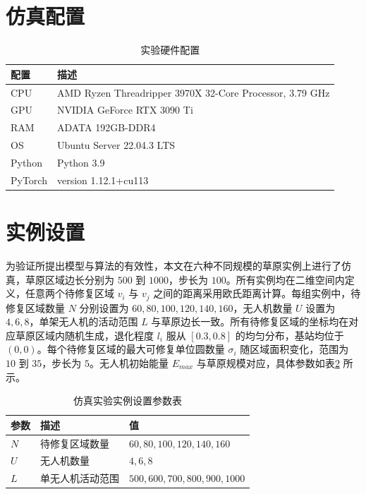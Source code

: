 \documentclass[AutoFakeBold]{LZUThesis}
\begin{document}
\section{仿真配置}
\begin{table}[H]
	\centering
	\caption{实验硬件配置}
	\begin{tabular}{ll} %
		\toprule
		配置      & 描述                                                       \\
		\midrule
		CPU     & AMD Ryzen Threadripper 3970X 32-Core Processor, 3.79 GHz \\
		GPU     & NVIDIA GeForce RTX 3090 Ti                               \\
		RAM     & ADATA 192GB-DDR4                                         \\
		OS      & Ubuntu Server 22.04.3 LTS                                \\
		Python  & Python 3.9                                               \\
		PyTorch & version 1.12.1+cu113                                     \\
		\bottomrule
	\end{tabular}
	\label{tbl_hardware_config}
\end{table}
\section{实例设置}
为验证所提出模型与算法的有效性，本文在六种不同规模的草原实例上进行了仿真，草原区域边长分别为 $500$ 到 $1000$，步长为 $100$。所有实例均在二维空间内定义，任意两个待修复区域 $v_i$ 与 $v_j$ 之间的距离采用欧氏距离计算。每组实例中，待修复区域数量 $N$ 分别设置为 $60, 80, 100, 120, 140, 160$，无人机数量 $U$ 设置为 $4, 6, 8$，单架无人机的活动范围 $L$ 与草原边长一致。所有待修复区域的坐标均在对应草原区域内随机生成，退化程度 $l_i$ 服从 $[0.3, 0.8]$ 的均匀分布，基站均位于 $(0,0)$。每个待修复区域的最大可修复单位圆数量 $\sigma_i$ 随区域面积变化，范围为 $10$ 到 $35$，步长为 $5$。无人机初始能量 $E_{max}$ 与草原规模对应，具体参数如表\ref{tbl_instance_setting} 所示。

\begin{table}[H]
	\centering
	\caption{仿真实验实例设置参数表}
	\begin{tabular}{lll}
		\toprule
		参数  & 描述       & 值                               \\
		\midrule
		$N$ & 待修复区域数量  & $60, 80, 100, 120, 140, 160$    \\
		$U$ & 无人机数量    & $4, 6, 8$                       \\
		$L$ & 单无人机活动范围 & $500, 600, 700, 800, 900, 1000$ \\
		\bottomrule
	\end{tabular}
	\label{tbl_instance_setting}
\end{table}
\end{document}
